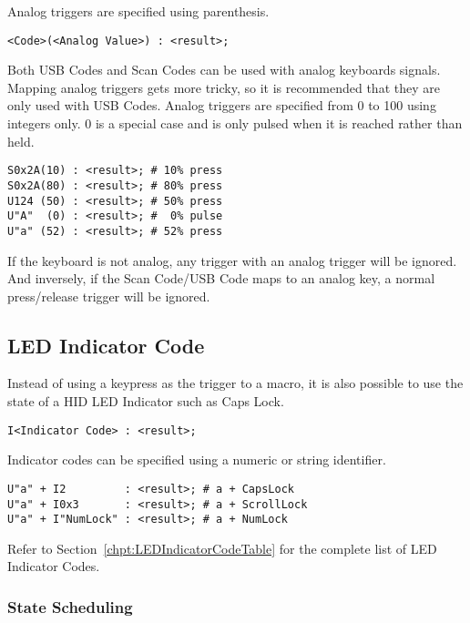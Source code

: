 \documentclass{kiibohd-template}
\begin{document}
Analog triggers are specified using parenthesis.

\begin{lstlisting}
<Code>(<Analog Value>) : <result>;
\end{lstlisting}

Both USB Codes and Scan Codes can be used with analog keyboards signals.
Mapping analog triggers gets more tricky, so it is recommended that they are only used with USB Codes.
Analog triggers are specified from 0 to 100 using integers only.
0 is a special case and is only pulsed when it is reached rather than held.

\begin{lstlisting}
S0x2A(10) : <result>; # 10% press
S0x2A(80) : <result>; # 80% press
U124 (50) : <result>; # 50% press
U"A"  (0) : <result>; #  0% pulse
U"a" (52) : <result>; # 52% press
\end{lstlisting}

If the keyboard is not analog, any trigger with an analog trigger will be ignored.
And inversely, if the Scan Code/USB Code maps to an analog key, a normal press/release trigger will be ignored.


\subsection{LED Indicator Code}
\label{subsec:LED_Indicator_Code}

Instead of using a keypress as the trigger to a macro, it is also possible to use the state of a HID LED Indicator such as Caps Lock.

\begin{lstlisting}
I<Indicator Code> : <result>;
\end{lstlisting}

Indicator codes can be specified using a numeric or string identifier.

\begin{lstlisting}
U"a" + I2         : <result>; # a + CapsLock
U"a" + I0x3       : <result>; # a + ScrollLock
U"a" + I"NumLock" : <result>; # a + NumLock
\end{lstlisting}

Refer to Section~\ref{chpt:LEDIndicatorCodeTable} for the complete list of LED Indicator Codes.


\subsubsection{State Scheduling}
\end{document}
